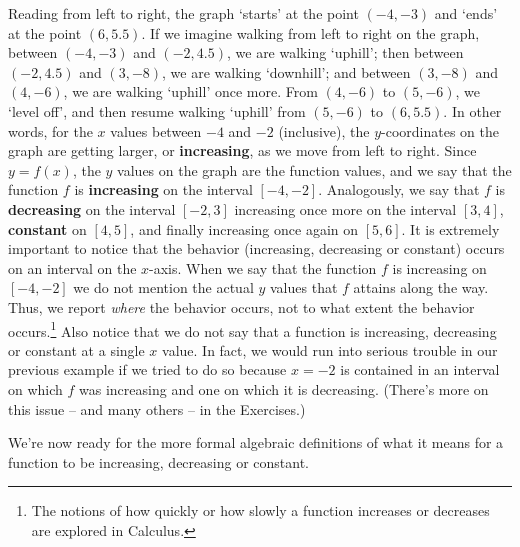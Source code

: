 Reading from left to right, the graph `starts' at the point $(-4,-3)$ and `ends' at the point $(6,5.5)$.  If we imagine walking from left to right on the graph, between $(-4,-3)$ and $(-2,4.5)$, we are walking `uphill'; then between $(-2,4.5)$ and $(3,-8)$, we are walking `downhill'; and between $(3,-8)$ and $(4,-6)$, we are walking `uphill' once more.  From $(4,-6)$ to $(5, -6)$, we `level off', and then resume walking `uphill' from $(5,-6)$ to $(6,5.5)$.  In other words, for the $x$ values between $-4$ and $-2$ (inclusive), the $y$-coordinates on the graph are getting larger, or  \textbf{increasing}, as we move from left to right.  Since $y = f(x)$, the $y$ values on the graph are the function values, and we say that the function $f$ is \textbf{increasing} on the interval $[-4,-2]$.  Analogously, we say that $f$ is  \textbf{decreasing} on the interval $[-2,3]$ increasing once more on the interval $[3,4]$,  \textbf{constant} on $[4,5]$, and finally increasing once again on $[5,6]$.  It is extremely important to notice that the behavior (increasing, decreasing or constant) occurs on an interval on the $x$-axis.  When we say that the function $f$ is increasing on $[-4, -2]$ we do not mention the actual $y$ values that $f$ attains along the way.  Thus, we report \emph{where} the behavior occurs, not to what extent the behavior occurs.\footnote{The notions of how quickly or how slowly a function increases or decreases are explored in Calculus.}  Also notice that we do not say that a function is increasing, decreasing or constant at a single $x$ value.  In fact, we would run into serious trouble in our previous example if we tried to do so because $x = -2$ is contained in an interval on which $f$ was increasing and one on which it is decreasing.  (There's more on this issue -- and many others -- in the Exercises.) 

\smallskip 

We're now ready for the more formal algebraic definitions of what it means for a function to be increasing, decreasing or constant.

\smallskip

